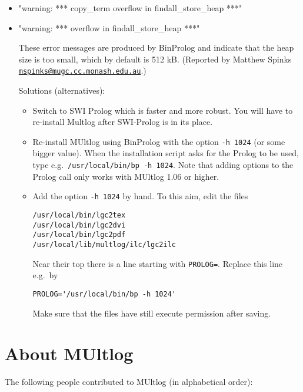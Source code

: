 \documentclass[]{article}
\begin{document}
\begin{itemize}
\item
  "warning: *** copy\_term overflow in findall\_store\_heap ***"
\item
  "warning: *** overflow in findall\_store\_heap ***"

  These error messages are produced by BinProlog and indicate that the
  heap size is too small, which by default is 512 kB. (Reported by
  Matthew Spinks
  \href{mailto:mspinks@mugc.cc.monash.edu.au}{\nolinkurl{mspinks@mugc.cc.monash.edu.au}}.)

  Solutions (alternatives):

  \begin{itemize}
  \item
    Switch to SWI Prolog which is faster and more robust. You will have
    to re-install Multlog after SWI-Prolog is in its place.
  \item
    Re-install MUltlog using BinProlog with the option \texttt{-h\ 1024}
    (or some bigger value). When the installation script asks for the
    Prolog to be used, type e.g.~\texttt{/usr/local/bin/bp\ -h\ 1024}.
    Note that adding options to the Prolog call only works with MUltlog
    1.06 or higher.
  \item
    Add the option \texttt{-h\ 1024} by hand. To this aim, edit the
    files

\begin{verbatim}
/usr/local/bin/lgc2tex
/usr/local/bin/lgc2dvi
/usr/local/bin/lgc2pdf
/usr/local/lib/multlog/ilc/lgc2ilc
\end{verbatim}

    Near their top there is a line starting with \texttt{PROLOG=}.
    Replace this line e.g.~by

\begin{verbatim}
PROLOG='/usr/local/bin/bp -h 1024'
\end{verbatim}

    Make sure that the files have still execute permission after saving.
  \end{itemize}
\end{itemize}

\hypertarget{about-multlog}{%
\section{About MUltlog}\label{about-multlog}}

The following people contributed to MUltlog (in alphabetical order):
\end{document}
